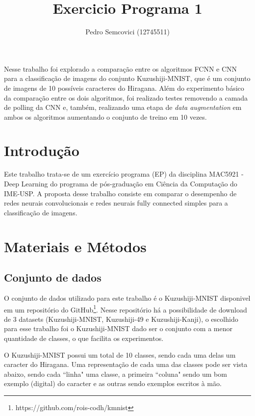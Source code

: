 \documentclass[12pt]{article}
\title{Exercicio Programa 1}
\author{Pedro Semcovici (12745511) }
\begin{document}
 

\maketitle
     
\begin{resumo} 
Nesse trabalho foi explorado a comparação entre os algoritmos FCNN e CNN para a classificação de imagens do conjunto Kuzushiji-MNIST, que é um conjunto de imagens de 10 possíveis caracteres do Hiragana. Além do experimento básico da comparação entre os dois algoritmos, foi realizado testes removendo a camada de polling da CNN e, também, realizando uma etapa de \textit{data augmentation} em ambos os algoritmos aumentando o conjunto de treino em 10 vezes.
\end{resumo}


\section{Introdução}
Este trabalho trata-se de um exercício programa (EP) da  disciplina MAC5921 - Deep Learning do programa de pós-graduação em Ciência da Computação do IME-USP. A proposta desse trabalho consiste em comparar o desempenho de redes neurais convolucionais e redes neurais fully connected simples para a classificação de imagens.



\section{Materiais e Métodos} 

\subsection{Conjunto de dados}

O conjunto de dados utilizado para este trabalho é o Kuzushiji-MNIST \cite{DBLP:journals/corr/abs-1812-01718} disponivel em um repositório do GitHub\footnote{https://github.com/rois-codh/kmnist}. Nesse repositório há a possibilidade de download de 3 datasets (Kuzushiji-MNIST, Kuzushiji-49 e Kuzushiji-Kanji), o escolhido para esse trabalho foi o Kuzushiji-MNIST dado ser o conjunto com a menor quantidade de classes, o que facilita os experimentos. 

O Kuzushiji-MNIST possui um total de 10 classes, sendo cada uma delas um caracter do Hiragana. Uma representação de cada uma das classes pode ser vista abaixo, sendo cada ``linha" uma classe, a primeira ``coluna" sendo um bom exemplo (digital) do caracter e as outras sendo exemplos escritos à mão.
\end{document}
